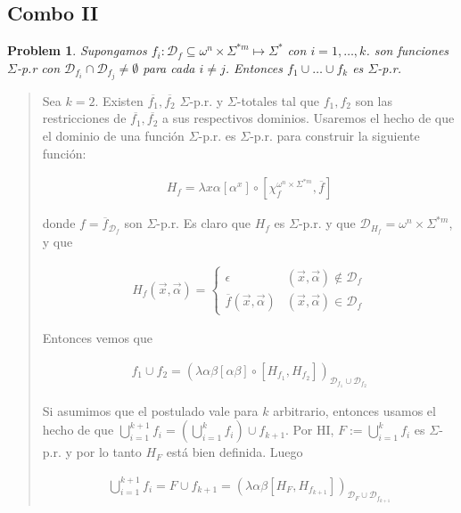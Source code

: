 \documentclass[a4paper, 12pt]{article}
\newtheorem{problem}{Problem}
\newtheorem{problem}{Problem}
\begin{document}
\pagebreak 

\subsection{Combo II}

\begin{problem}
    Supongamos $f_i : \mathcal{D}_f \subseteq \omega^{n} \times \Sigma^{*m}
    \mapsto \Sigma^{*}$ con $i = 1,\ldots,k$. son funciones $\Sigma$-p.r con
    $\mathcal{D}_{f_i} \cap \mathcal{D}_{f_j} \neq \emptyset$ para cada $i \neq
    j$. Entonces $f_1 \cup \ldots \cup f_k$ es $\Sigma$-p.r. 
\end{problem}


\small
\begin{quote}

Sea $k = 2$. Existen $\overline{f_1}, \overline{f_2}$ $\Sigma$-p.r. y
$\Sigma$-totales tal que $f_1, f_2$ son las restricciones de $\overline{f_1},
\overline{f_2}$ a sus respectivos dominios. Usaremos el hecho de que el dominio
de una función $\Sigma$-p.r. es $\Sigma$-p.r. para construir la siguiente
función:

\begin{align*}
    H_{f} = \lambda x\alpha \left[ \alpha^x  \right] \circ \left[
    \chi_{f}^{\omega^{n} \times \Sigma^{*m} }, \overline{f} \right] 
\end{align*}

donde $f = \overline{f}_{\mathcal{D}_{f}}$ son $\Sigma$-p.r. Es claro que $H_f$
es $\Sigma$-p.r. y que
$\mathcal{D}_{H_f} = \omega^{n} \times \Sigma^{*m} $, y que 

\begin{align*}
    H_f(\vec{x}, \vec{\alpha}) = \begin{cases}
        \epsilon & (\vec{x}, \vec{\alpha}) \not\in \mathcal{D}_{f} \\ 
        \overline{f}(\vec{x}, \vec{\alpha}) & (\vec{x}, \vec{\alpha}) \in
        \mathcal{D}_{f}
    \end{cases}
\end{align*}

Entonces vemos que 

\begin{align*}
    f_1 \cup f_2 = \left(   \lambda \alpha\beta \left[ \alpha \beta  \right]
    \circ \left[ H_{f_1}, H_{f_2} \right]  \right)_{\mathcal{D}_{f_1} \cup
\mathcal{D}_{f_2}}
\end{align*}

Si asumimos que el postulado vale para $k$ arbitrario, entonces usamos el hecho
de que $\bigcup_{i=1}^{k+1} f_i = \left( \bigcup_{i=1}^{k} f_i \right) \cup
f_{k+1} $. Por HI, $F := \bigcup_{i=1}^{k} f_i$ es $\Sigma$-p.r. y por lo tanto
$H_{F}$ está bien definida. Luego 

\begin{align*}
    \bigcup_{i=1}^{k+1} f_i = F \cup f_{k+1} = \left( \lambda \alpha\beta \left[
    H_{F}, H_{f_{k+1}}\right] \right)_{\mathcal{D}_{F} \cup \mathcal{D}_{f_{k+1}}}
\end{align*}

\end{quote}
\normalsize
\end{document}

